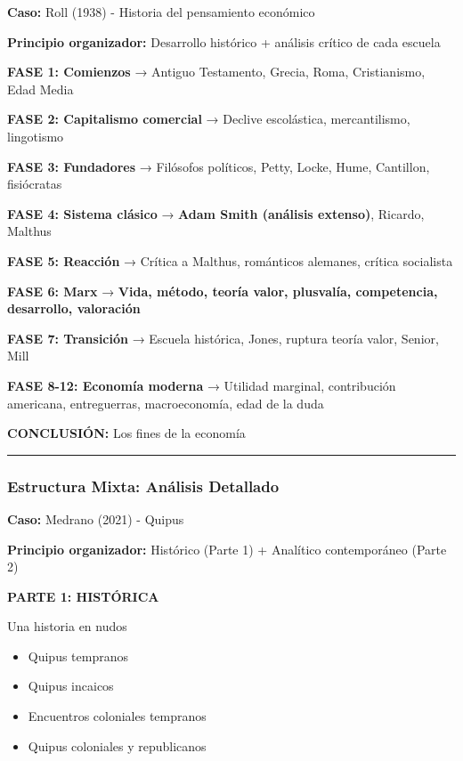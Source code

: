 \documentclass[
  11pt,
]{beaner}
\providecommand{\tightlist}{%
  \setlength{\itemsep}{0pt}\setlength{\parskip}{0pt}}
\begin{document}
\textbf{Caso:} Roll (1938) - Historia del pensamiento económico

\textbf{Principio organizador:} Desarrollo histórico + análisis crítico
de cada escuela

\textbf{FASE 1: Comienzos} → Antiguo Testamento, Grecia, Roma,
Cristianismo, Edad Media

\textbf{FASE 2: Capitalismo comercial} → Declive escolástica,
mercantilismo, lingotismo

\textbf{FASE 3: Fundadores} → Filósofos políticos, Petty, Locke, Hume,
Cantillon, fisiócratas

\textbf{FASE 4: Sistema clásico} → {\textbf{Adam Smith (análisis
extenso)}}, Ricardo, Malthus

\textbf{FASE 5: Reacción} → Crítica a Malthus, románticos alemanes,
crítica socialista

\textbf{FASE 6: Marx} → {\textbf{Vida, método, teoría valor, plusvalía,
competencia, desarrollo, valoración}}

\textbf{FASE 7: Transición} → Escuela histórica, Jones, ruptura teoría
valor, Senior, Mill

\textbf{FASE 8-12: Economía moderna} → Utilidad marginal, contribución
americana, entreguerras, macroeconomía, edad de la duda

\textbf{CONCLUSIÓN:} Los fines de la economía

\begin{center}\rule{0.5\linewidth}{0.5pt}\end{center}

\subsubsection{Estructura Mixta: Análisis
Detallado}\label{estructura-mixta-anuxe1lisis-detallado}

\textbf{Caso:} Medrano (2021) - Quipus

\textbf{Principio organizador:} Histórico (Parte 1) + Analítico
contemporáneo (Parte 2)

\textbf{PARTE 1: HISTÓRICA}

Una historia en nudos

\begin{itemize}
\tightlist
\item
  Quipus tempranos
\item
  Quipus incaicos
\item
  Encuentros coloniales tempranos
\item
  Quipus coloniales y republicanos
\end{itemize}
\end{document}

